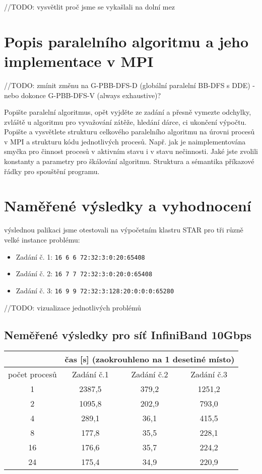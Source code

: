 \documentclass[12pt]{article}
\begin{document}
//TODO: vysvětlit proč jsme se vykašlali na dolní mez

\section{Popis paralelního algoritmu a jeho implementace v MPI}

//TODO: zmínit změnu na G-PBB-DFS-D (globální paralelní BB-DFS s DDE) - nebo dokonce G-PBB-DFS-V (always exhaustive)?




Popište paralelní algoritmus, opět vyjděte ze zadání a přesně
vymezte odchylky, zvláště u algoritmu pro vyvažování zátěže, hledání
dárce, ci ukončení výpočtu.  Popište a vysvětlete strukturu
celkového paralelního algoritmu na úrovni procesů v MPI a strukturu
kódu jednotlivých procesů. Např. jak je naimplementována smyčka pro
činnost procesů v aktivním stavu i v stavu nečinnosti. Jaké jste
zvolili konstanty a parametry pro škálování algoritmu. Struktura a
sémantika příkazové řádky pro spouštění programu.

\section{Naměřené výsledky a vyhodnocení}

výslednou palikaci jsme otestovali na výpočetním klastru STAR pro tři různě velké instance problému:

\begin{itemize}
\item Zadání č. 1: \texttt{16 6 6 72:32:3:0:20:65408}
\item Zadání č. 2: \texttt{16 7 7 72:32:3:0:20:0:65408}
\item Zadání č. 3: \texttt{16 9 9 72:32:3:128:20:0:0:0:65280}

\end{itemize}


//TODO: vizualizace jednotlivých problémů



\subsection{Neměřené výsledky pro síť InfiniBand 10Gbps}

\begin{tabular}{|c|c|c|c|}
\hline 
 & \multicolumn{3}{c|}{čas [s] (zaokrouhleno na 1 desetiné místo)} \\ 
\hline 
počet procesů & Zadání č.1 & Zadání č.2 & Zadání č.3 \\ 
\hline 
1 & 2387,5 & 379,2 & 1251,2 \\ 
\hline 
2 & 1095,8 & 202,9 & 793,0 \\ 
\hline 
4 & 289,1 & 36,1 & 415,5 \\ 
\hline 
8 & 177,8 & 35,5 & 228,1 \\ 
\hline 
16 & 176,6 & 35,7 & 224,2 \\ 
\hline 
24 & 175,4 & 34,9 & 220,9 \\ 
\hline 
\end{tabular} 
\end{document}
